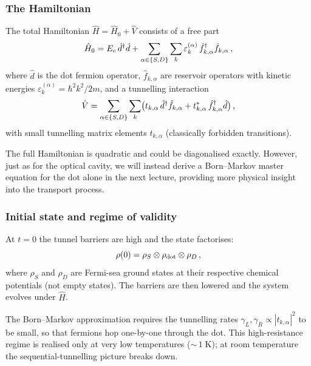 \subsubsection{The Hamiltonian}

The total Hamiltonian $\hat{H} = \hat{H}_0 + \hat{V}$ consists of a
free part
\begin{equation}\label{eq:dot-H0}
  \hat{H}_0
  = E_c\, \hat{d}^\dagger \hat{d}
  + \sum_{\alpha \in \{S,D\}} \sum_k
    \varepsilon_k^{(\alpha)}\,
    \hat{f}_{k,\alpha}^\dagger \hat{f}_{k,\alpha}\,,
\end{equation}
where $\hat{d}$ is the dot fermion operator,
$\hat{f}_{k,\alpha}$ are reservoir operators with kinetic energies
$\varepsilon_k^{(\alpha)} = \hbar^2 k^2 / 2m$, and a tunnelling
interaction
\begin{equation}\label{eq:dot-V}
  \hat{V}
  = \sum_{\alpha \in \{S,D\}} \sum_k
    \bigl(t_{k,\alpha}\,\hat{d}^\dagger \hat{f}_{k,\alpha}
    + t_{k,\alpha}^*\,\hat{f}_{k,\alpha}^\dagger \hat{d}\bigr)\,,
\end{equation}
with small tunnelling matrix elements $t_{k,\alpha}$ (classically
forbidden transitions).

\begin{remark}
  The full Hamiltonian is quadratic and could be diagonalised exactly.
  However, just as for the optical cavity, we will instead derive a
  Born--Markov master equation for the dot alone in the next lecture,
  providing more physical insight into the transport process.
\end{remark}

\subsubsection{Initial state and regime of validity}

At $t = 0$ the tunnel barriers are high and the state factorises:
\begin{equation}\label{eq:dot-initial}
  \rho(0)
  = \rho_S \otimes \rho_{\mathrm{dot}} \otimes \rho_D\,,
\end{equation}
where $\rho_S$ and $\rho_D$ are Fermi-sea ground states at their
respective chemical potentials (not empty states).  The barriers are
then lowered and the system evolves under $\hat{H}$.

\begin{intuition}
  The Born--Markov approximation requires the tunnelling rates
  $\gamma_L, \gamma_R \propto |t_{k,\alpha}|^2$ to be small, so that
  fermions hop one-by-one through the dot.  This high-resistance
  regime is realised only at very low temperatures
  (${\sim}\,1\;\text{K}$); at room temperature the
  sequential-tunnelling picture breaks down.
\end{intuition}

